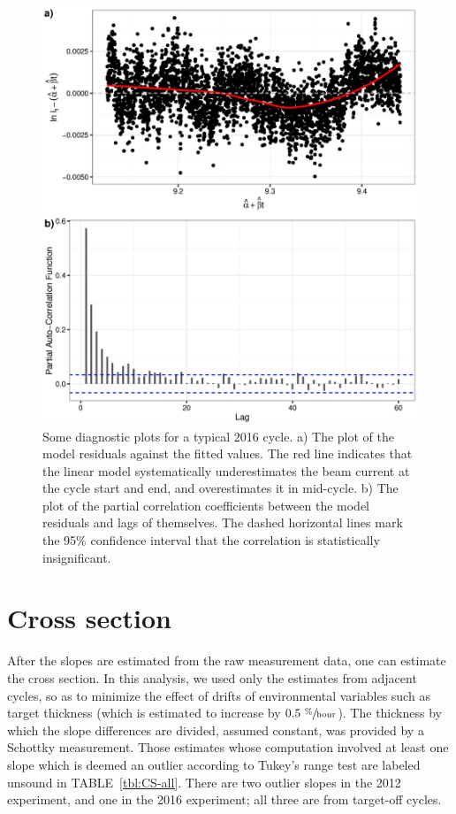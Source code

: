 \documentclass[reprint, superscriptaddress]{revtex4-1}
\newcommand{\scl}{.4}
\begin{document}
\begin{figure}
\centering
\includegraphics[scale=\scl]{img/DiagPlot_969.eps}
\caption{Some diagnostic plots for a typical 2016 cycle. a) The plot of the model residuals against the fitted values. The red line indicates that the linear model systematically underestimates the beam current at the cycle start and end, and overestimates it in mid-cycle. b) The plot of the partial correlation coefficients between the model residuals and lags of themselves. The dashed horizontal lines mark the 95\% confidence interval that the correlation is statistically insignificant.\label{fig:Run969}}
\end{figure}

\section{Cross section}
After the slopes are estimated from the raw measurement data, one can estimate the cross section. In this analysis, we used only the estimates from adjacent cycles, so as to minimize the effect of drifts of environmental variables such as target thickness (which is estimated to increase by $0.5~ \sfrac{\%}{\mathrm{hour}}$). The thickness by which the slope differences are divided, assumed constant, was provided by a Schottky measurement. Those estimates whose computation involved at least one slope which is deemed an outlier according to Tukey's range test are labeled unsound in TABLE~\ref{tbl:CS-all}. There are two outlier slopes in the 2012 experiment, and one in the 2016 experiment; all three are from target-off cycles.
\end{document}
